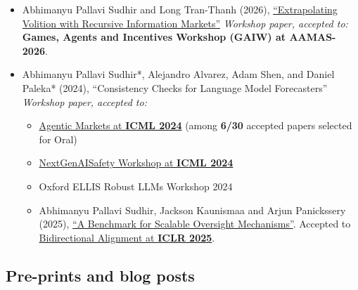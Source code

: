 \begin{itemize}
      \item Abhimanyu Pallavi Sudhir and Long Tran-Thanh (2026), \href{https://arxiv.org/pdf/2604.08606}{``Extrapolating Volition with Recursive Information Markets''} \emph{Workshop paper, accepted to:} \textbf{Games, Agents and Incentives Workshop (GAIW) at AAMAS-2026}.
      \item Abhimanyu Pallavi Sudhir*, Alejandro Alvarez, Adam Shen, and Daniel Paleka* (2024), ``Consistency Checks for Language Model Forecasters'' \emph{Workshop paper, accepted to:}
      \begin{itemize}
      \item \href{https://openreview.net/group?id=ICML.cc/2024/Workshop/Agentic_Markets}{Agentic Markets at \textbf{ICML 2024}} (among \textbf{6/30} accepted papers selected for Oral)
      \item \href{https://openreview.net/group?id=ICML.cc/2024/Workshop/NextGenAISafety}{NextGenAISafety Workshop at \textbf{ICML 2024}}
      \item Oxford ELLIS Robust LLMs Workshop 2024
      \item Abhimanyu Pallavi Sudhir, Jackson Kaunismaa and Arjun Panickssery (2025), \href{https://arxiv.org/abs/2504.03731}{``A Benchmark for Scalable Oversight Mechanisms''}. Accepted to \href{https://openreview.net/group?id=ICLR.cc/2025/Workshop/Bi-Align}{Bidirectional Alignment at \textbf{ICLR 2025}}.
      \end{itemize}

\end{itemize}

\subsection*{Pre-prints and blog posts}

